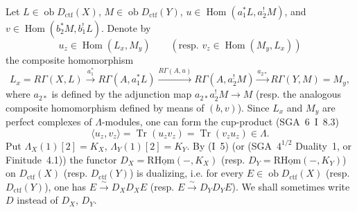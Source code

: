 \documentclass[11pt]{article}
\DeclareMathOperator{\Hom}{Hom}
\newcommand{\ob}{\operatorname{ob}}
\providecommand{\ctf}{\mathrm{ctf}}
\providecommand{\Tr}{\operatorname{Tr}}
\providecommand{\Tr}{\operatorname{Tr}}
\providecommand{\Tr}{\operatorname{Tr}}
\providecommand{\Hom}{\operatorname{Hom}}
\providecommand{\ob}{\operatorname{ob}}
\providecommand{\Tr}{\operatorname{Tr}}
\providecommand{\Hom}{\operatorname{Hom}}
\providecommand{\Tr}{\operatorname{Tr}}
\begin{document}
Let $L\in \ob D_{\ctf}(X)$, $M\in \ob D_{\ctf}(Y)$, $u\in\Hom(a_1^*L,a_2^!M)$, and $v\in\Hom(b_2^*M,b_1^!L)$. Denote by
\[
u_z\in\Hom(L_x,M_y)\qquad (\text{resp. }v_z\in\Hom(M_y,L_x))
\]
the composite homomorphism
\[
L_x=R\Gamma(X,L)\xrightarrow{a_1^*}R\Gamma(A,a_1^*L)
\xrightarrow{R\Gamma(A,u)}R\Gamma(A,a_2^!M)
\xrightarrow{a_{2*}}R\Gamma(Y,M)=M_y,
\]
where $a_{2*}$ is defined by the adjunction map $a_{2*}a_2^!M\to M$ (resp. the analogous composite homomorphism defined by means of $(b,v)$). Since $L_x$ and $M_y$ are perfect complexes of $\Lambda$-modules, one can form the cup-product (SGA~6~I~8.3)
\begin{equation}\tag{1.1.1}
\langle u_z,v_z\rangle=\Tr(u_zv_z)=\Tr(v_zu_z)\in\Lambda.
\end{equation}
Put $\Lambda_X(1)[2]=K_X$, $\Lambda_Y(1)[2]=K_Y$. By (I~5) (or (SGA~$4^{1/2}$ Duality~1, or Finitude~4.1)) the functor $D_X=\mathrm{R}\underline{\mathrm{Hom}}(-,K_X)$ (resp. $D_Y=\mathrm{R}\underline{\mathrm{Hom}}(-,K_Y)$) on $D_{\ctf}(X)$ (resp. $D_{\ctf}(Y)$) is dualizing, i.e. for every $E\in\ob D_{\ctf}(X)$ (resp. $D_{\ctf}(Y)$), one has $E\xrightarrow{\sim}D_XD_XE$ (resp. $E\xrightarrow{\sim}D_YD_YE$). We shall sometimes write $D$ instead of $D_X$, $D_Y$.
\end{document}
